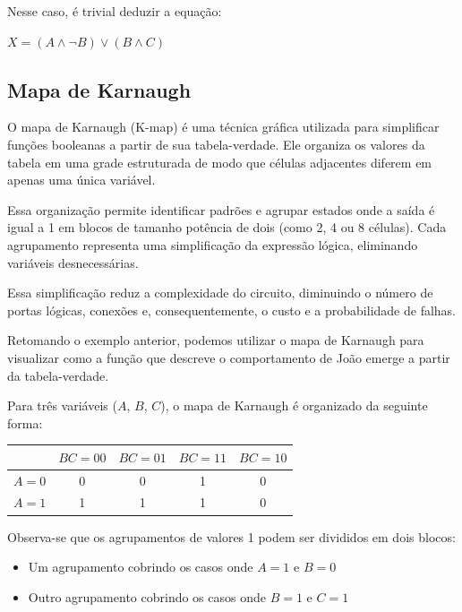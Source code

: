 Nesse caso, é trivial deduzir a equação: 

\begin{center}
$X = (A \land \lnot{B}) \lor (B \land C)$
\end{center}

\subsection{Mapa de Karnaugh}

O mapa de Karnaugh (K-map) é uma técnica gráfica utilizada para simplificar funções booleanas a partir de sua tabela-verdade. Ele organiza os valores da tabela em uma grade estruturada de modo que células adjacentes diferem em apenas uma única variável.

Essa organização permite identificar padrões e agrupar estados onde a saída é igual a 1 em blocos de tamanho potência de dois (como 2, 4 ou 8 células). Cada agrupamento representa uma simplificação da expressão lógica, eliminando variáveis desnecessárias.

Essa simplificação reduz a complexidade do circuito, diminuindo o número de portas lógicas, conexões e, consequentemente, o custo e a probabilidade de falhas.

Retomando o exemplo anterior, podemos utilizar o mapa de Karnaugh para visualizar como a função que descreve o comportamento de João emerge a partir da tabela-verdade.

Para três variáveis ($A$, $B$, $C$), o mapa de Karnaugh é organizado da seguinte forma:

\begin{center}
\begin{tabular}{c|cccc}
 & $BC=00$ & $BC=01$ & $BC=11$ & $BC=10$ \\
\hline
$A=0$ & 0 & 0 & 1 & 0 \\
$A=1$ & 1 & 1 & 1 & 0 \\
\end{tabular}
\end{center}

Observa-se que os agrupamentos de valores 1 podem ser divididos em dois blocos:

\begin{itemize}
    \item Um agrupamento cobrindo os casos onde $A = 1$ e $B = 0$
    \item Outro agrupamento cobrindo os casos onde $B = 1$ e $C = 1$
\end{itemize}

